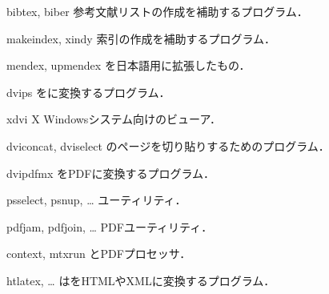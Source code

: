 \documentclass[uplatex,dvipdfmx]{jsarticle}
\begin{document}
%
\begin{cmddescription}
\item[bibtex, biber]
参考文献リストの作成を補助するプログラム．

\item[makeindex, xindy]
索引の作成を補助するプログラム．

\item[mendex, upmendex]
を日本語用に拡張したもの．

\item[dvips]
\DVI を\PS に変換するプログラム．

\item[xdvi]
X Windowsシステム向けの\DVI ビューア．

\item[dviconcat, dviselect]
\DVI のページを切り貼りするためのプログラム．

\item[dvipdfmx]
\DVI をPDFに変換するプログラム．

\item[psselect, psnup, \ldots]
\PS ユーティリティ．

\item[pdfjam, pdfjoin, \ldots]
PDFユーティリティ．

\item[context, mtxrun]
\ConTeXt とPDFプロセッサ．

\item[htlatex, \ldots]
は\AllTeX をHTMLやXMLに変換するプログラム．
\end{cmddescription}
\end{document}
